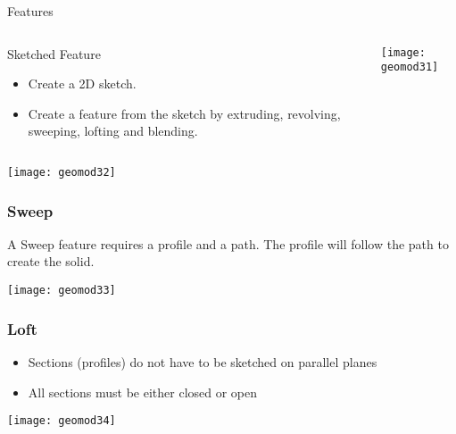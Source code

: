 \begin{frame}[fragile]{Features}
 \begin{columns}
  \begin{column}{0.55\linewidth}

Sketched Feature 

\begin{itemize}
\item Create a 2D sketch.
\item Create a feature from the sketch by extruding, revolving, sweeping, lofting and blending.

\end{itemize}
	
  \end{column}%
  \begin{column}{0.45\linewidth}
			\begin{center}
	\texttt{[image: geomod31]}
			\end{center}
  \end{column}
 \end{columns}
 
 			\begin{center}
	\texttt{[image: geomod32]}
			\end{center}
			
\end{frame}

\begin{frame}[fragile]\frametitle{Sweep}

A Sweep feature requires a profile and a path. The profile will follow the path to create the solid.

			\begin{center}
	\texttt{[image: geomod33]}
			\end{center}
\end{frame}

\begin{frame}[fragile]\frametitle{Loft}

\begin{itemize}
\item Sections (profiles) do not have to be sketched on parallel planes
\item All sections must be either closed or open
\end{itemize}

			\begin{center}
	\texttt{[image: geomod34]}
			\end{center}
\end{frame}

